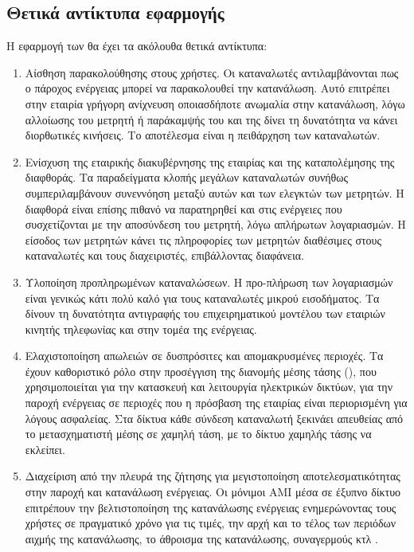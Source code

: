 \subsection{Θετικά αντίκτυπα εφαρμογής }
Η εφαρμογή των  θα έχει τα ακόλουθα θετικά αντίκτυπα:
\begin{enumerate}
\item Αίσθηση παρακολούθησης στους χρήστες. Οι καταναλωτές αντιλαμβάνονται πως ο πάροχος ενέργειας μπορεί να παρακολουθεί την κατανάλωση. Αυτό επιτρέπει στην εταιρία γρήγορη ανίχνευση οποιασδήποτε ανωμαλία στην κατανάλωση, λόγω αλλοίωσης του μετρητή ή παράκαμψής του και της δίνει τη δυνατότητα να κάνει διορθωτικές κινήσεις. Το αποτέλεσμα είναι η πειθάρχηση των καταναλωτών.
\item Ενίσχυση της εταιρικής διακυβέρνησης της εταιρίας και της καταπολέμησης της διαφθοράς. Τα παραδείγματα κλοπής μεγάλων καταναλωτών συνήθως συμπεριλαμβάνουν συνεννόηση μεταξύ αυτών και των ελεγκτών των μετρητών. Η διαφθορά είναι επίσης πιθανό να παρατηρηθεί και στις ενέργειες που συσχετίζονται με την αποσύνδεση του μετρητή, λόγω απλήρωτων λογαριασμών. Η είσοδος των μετρητών κάνει τις πληροφορίες των μετρητών διαθέσιμες στους καταναλωτές και τους διαχειριστές, επιβάλλοντας διαφάνεια.
\item Υλοποίηση προπληρωμένων καταναλώσεων. Η προ-πλήρωση των λογαριασμών είναι γενικώς κάτι πολύ καλό για τους καταναλωτές μικρού εισοδήματος. Τα  δίνουν τη δυνατότητα αντιγραφής του επιχειρηματικού μοντέλου των εταιριών κινητής τηλεφωνίας και στην τομέα της ενέργειας.
\item Ελαχιστοποίηση απωλειών σε δυσπρόσιτες και απομακρυσμένες περιοχές. Τα  έχουν καθοριστικό ρόλο στην προσέγγιση της διανομής μέσης τάσης (), που χρησιμοποιείται για την κατασκευή και λειτουργία ηλεκτρικών δικτύων, για την παροχή ενέργειας σε περιοχές που η πρόσβαση της εταιρίας είναι περιορισμένη για λόγους ασφαλείας. Στα  δίκτυα κάθε σύνδεση καταναλωτή ξεκινάει απευθείας από το μετασχηματιστή μέσης σε χαμηλή τάση, με το δίκτυο χαμηλής τάσης να εκλείπει.
\item Διαχείριση από την πλευρά της ζήτησης για μεγιστοποίηση αποτελεσματικότητας στην παροχή και κατανάλωση ενέργειας. Οι μόνιμοι AMI μέσα σε έξυπνο δίκτυο επιτρέπουν την βελτιστοποίηση της κατανάλωσης ενέργειας ενημερώνοντας τους χρήστες σε πραγματικό χρόνο για τις τιμές, την αρχή και το τέλος των περιόδων αιχμής της κατανάλωσης, το άθροισμα της κατανάλωσης, συναγερμούς κτλ \cite{reduceloss}.
\end{enumerate}
